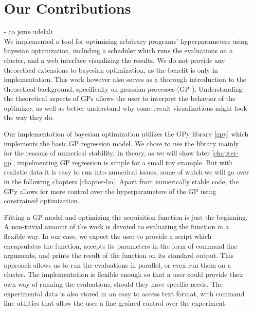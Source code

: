 




\section{Our Contributions}

- co jsme udelali
\\

We implemented a tool for optimizing arbitrary programs' hyperparameters using
bayesian optimization, including a scheduler which runs the evaluations on a
cluster, and a web interface visualizing the results. We do not provide any
theoretical extensions to bayesian optimization, as the benefit is only in
implementation. This work however also serves as a thorough introduction to the
theoretical background, specifically on gaussian processes (GP ). Understanding the theoretical aspects of GPs allows the
user to interpret the behavior of the optimizer, as well as better understand
why some result visualizations might look the way they do.

Our implementation of bayesian optimization utilizes the GPy library \ref{gpy}
which implements the basic GP regression model. We chose to use the library
mainly for the reasons of numerical stability. In theory, as we will show later
\ref{chapter-gp}, impelmenting GP regression is simple for a small toy example.
But with realistic data it is easy to run into numerical issues, some of which
we will go over in the following chapters \ref{chapter-bo}. Apart from
numerically stable code, the GPy allows for more control over the
hyperparameters of the GP using constrained optimization.

Fitting a GP model and optimizing the acquisition function is just the
beginning. A non-trivial amount of the work is devoted to evaluating the
function in a flexible way. In our case, we expect the user to provide a script
which encapsulates the function, accepts its parameters in the form of command
line arguments, and prints the result of the function on its standard output.
This approach allows us to run the evaluations in parallel, or even run them on
a cluster. The implementation is flexible enough so that a user could provide
their own way of running the evaluations, should they have specific needs.  The
experimental data is also stored in an easy to access text format, with command
line utilities that allow the user a fine grained control over the experiment.

